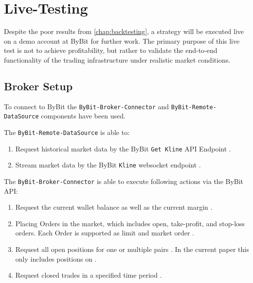 \section{Live-Testing}
\label{chap:live-test}

Despite the poor results from \autoref{chap:backtesting}, a strategy will be executed live on a demo account at ByBit for further work.
The primary purpose of this live test is not to achieve profitability, but rather to validate the end-to-end functionality of the trading infrastructure under realistic market conditions.


\subsection{Broker Setup}

To connect to ByBit the \texttt{ByBit-Broker-Connector} and \texttt{ByBit-Remote-DataSource} components have been used.

The \texttt{ByBit-Remote-DataSource} is able to:

\begin{enumerate}
    \item Request historical market data by the ByBit \texttt{Get Kline} API Endpoint \cite{get-kline}.
    \item Stream market data by the ByBit \texttt{Kline} websocket endpoint \cite{stream-kline}.
\end{enumerate}

\noindent
The \texttt{ByBit-Broker-Connector} is able to execute following actions via the ByBit API:

\begin{enumerate}
    \item Request the current wallet balance as well as the current margin \cite{wallet-balance}.
    \item Placing Orders in the market, which includes open, take-profit, and stop-loss orders. Each Order is supported as limit and market order \cite{place-order}.
    \item Request all open positions for one or multiple pairs \cite{position-info}. In the current paper this only includes positions on \ethusdc.
    \item Request closed trades in a specified time period \cite{closed-pnl}.
\end{enumerate}

